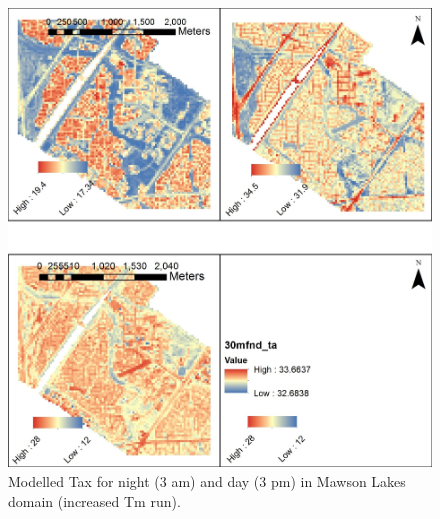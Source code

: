 \documentclass[final,3p,times,authoryear]{elsarticle}
\begin{document}
%
%


\begin{figure}[!htbp]
\includegraphics[trim=0mm 0mm 0mm 0mm, clip,scale=0.5]{images/MawsonModelledTas.jpg}
 \caption{Modelled Tax for night (3 am) and day (3 pm) in Mawson Lakes domain (increased Tm run).} \label{fig:MawsonModelledTas}
\end{figure}
\end{document}
